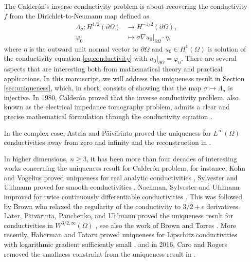 \documentclass[12pt]{article}
\begin{document}
The Calderón's inverse conductivity problem is about recovering the conductivity $f$ from the Dirichlet-to-Neumann map defined as
\begin{align}\label{eq:D-N}
\nonumber \Lambda_{\sigma}\colon H^{1/2}(\partial \Omega)&\rightarrow H^{-1/2}(\partial \Omega),\\
  \varphi_0 &\mapsto \sigma \nabla u_0|_{\partial \Omega}\cdot \eta,
\end{align}
where $\eta$ is the outward unit normal vector to $\partial\Omega$ and $u_0\in H^1(\Omega)$ is solution of the conductivity equation \eqref{eq:conductivity} with $u_0|_{\partial\Omega}=\varphi_0$.
There are several aspects that are interesting both from mathematical theory and practical applications. In this manuscript, we will address the uniqueness result in Section \ref{sec:uniqueness}, which, in short, consists of showing that the map $\sigma\mapsto \Lambda_{\sigma}$ is injective. In 1980, Calderón proved that the inverse conductivity problem, also known as the electrical impedance tomography problem, admits a clear and precise mathematical formulation through the conductivity equation \cite{Calderon}.

In the complex case, Astala and P\"aiv\"{a}rinta proved the uniqueness for $L^{\infty}(\Omega)$ conductivities away from zero and infinity \cite{AstPai2006} and the reconstruction in \cite{Astala-2}.

In higher dimensions, $n\geq 3$, it has been more than four decades of interesting works concerning the uniqueness result for Calder\'{o}n problem, for instance, Kohn and Vogelius proved uniqueness for real analytic conductivities \cite{Vogelius}, Sylvester and Uhlmann proved for smooth conductivities \cite{Sylvester-Uhlmann-1986, Sylvester-Uhlmann, Sylvester-Uhlmann-1988}, Nachman, Sylvester and Uhlmann improved for twice continuously differentiable conductivities \cite{Nachman}. 
This was followed by Brown \cite{Brown-1996} 
who relaxed the regularity of the conductivity to $3/2+\epsilon$ derivatives. Later, P\"aiv\"arinta, Panchenko, and Uhlmann proved the uniqueness result for conductivities in $W^{3/2,\infty}(\Omega)$ \cite{Paivarinta2003}, see also the work of Brown and Torres \cite{Russell-1}. More recently, Haberman and Tataru proved uniqueness for Lipschitz conductivities with logarithmic gradient sufficiently small \cite{Haberman-Tataru}, and in 2016, Caro and Rogers removed the smallness constraint from the uniqueness result in \cite{Caro-Rogers}.
\end{document}
